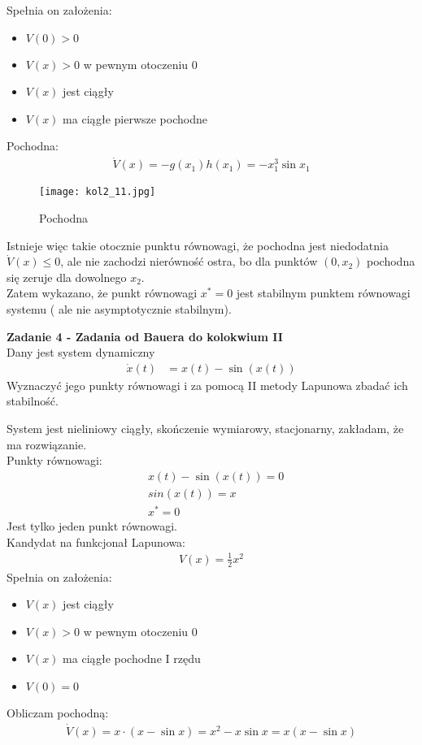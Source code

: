 \documentclass[a4paper,11pt]{article}
\begin{document}
Spełnia on założenia:
\begin{itemize}
\item \( V(0) > 0 \) 
\item \( V(x) > 0 \) w pewnym otoczeniu 0
\item \( V(x) \) jest ciągły
\item \( V(x) \) ma ciągłe pierwsze pochodne
\end{itemize}
Pochodna:
\begin{align*}
\dot{V}(x)=-g(x_{1})h(x_{1})=-x_{1}^{3}\sin x_{1}
\end{align*}
\begin{figure}[H]
\centerline{\texttt{[image: kol2\_11.jpg]}}
\caption{Pochodna}
\label{fig:kol2_11}
\end{figure}
Istnieje więc takie otocznie punktu równowagi, że pochodna jest niedodatnia \( \dot{V}(x) \leq 0 \), ale nie zachodzi nierówność ostra, bo dla punktów \( ( 0, x_{2} ) \) pochodna się zeruje dla dowolnego \( x_{2} \). \\
Zatem wykazano, że punkt równowagi \(x^{*}=0\) jest stabilnym punktem równowagi systemu ( ale nie asymptotycznie stabilnym).

\newpage
\begin{framed}
\textbf{Zadanie 4 - Zadania od Bauera do kolokwium II } \\ 
Dany jest system dynamiczny 
\begin{align*}
\dot{x}(t)&=x(t)- \sin (x(t))
\end{align*}
Wyznaczyć jego punkty równowagi i za pomocą II metody Lapunowa zbadać ich stabilność. 
\end{framed}
System jest nieliniowy ciągły, skończenie wymiarowy, stacjonarny, zakładam, że ma rozwiązanie.\\
Punkty równowagi: \\
\begin{align*}
& x(t) - \sin (x(t)) = 0 \\
& sin( x(t) ) = x \\
& x^{*} = 0 
\end{align*}
Jest tylko jeden punkt równowagi. \\
Kandydat na funkcjonał Lapunowa: \\
\begin{align*}
V(x)=\frac{1}{2}x^{2}
\end{align*}
Spełnia on założenia: \\
\begin{itemize}
\item \( V(x) \) jest ciągły 
\item \( V(x)>0 \) w pewnym otoczeniu \( 0 \)
\item \( V(x) \) ma ciągłe pochodne I rzędu
\item \( V(0) = 0 \) 
\end{itemize}
Obliczam pochodną: \\ 
\begin{align*}
\dot{V}(x)=x \cdot ( x - \sin x ) = x^{2}-x \sin x = x(x- \sin x) 
\end{align*}
\end{document}
